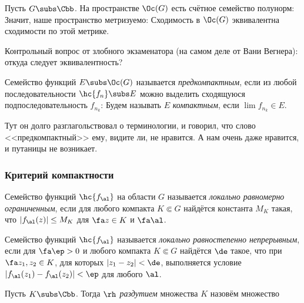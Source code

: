 \documentclass[a4paper]{article}
\begin{document}
\begin{theorem}
Пусть $G\subs \Cbb$. На пространстве $\Oc(G)$ есть счётное семейство полунорм:
Значит, наше пространство метризуемо:
Сходимость в $\Oc(G)$ эквивалентна сходимости по этой метрике.

\begin{petit}
Контрольный вопрос от злобного экзаменатора (на самом деле от Вани Вегнера): откуда следует эквивалентность?
\end{petit}

\begin{df} Семейство функций $E\subs \Oc(G)$ называется \emph{предкомпактным}, если из
любой последовательности $\hc{f_n}\subs E$ можно выделить сходящуюся подпоследовательность $f_{n_k}$:
Будем называть $E$ \emph{компактным}, если $\lim f_{n_k}\in E$.
\end{df}

\begin{petit}
Тут он долго разглагольствовал о терминологии, и говорил, что слово <<предкомпактный>> ему, видите ли, не нравится.
А нам очень даже нравится, и путаницы не возникает.
\end{petit}


\subsubsection{Критерий компактности}

\begin{df}
Семейство функций $\hc{f_\al}$ на области $G$ называется \emph{локально равномерно ограниченным},
если для любого компакта $K \Subset G$ найдётся константа $M_K$ такая, что $|f_\al(z)| \le M_K$
для $\fa z \in K$ и $\fa \al$.
\end{df}

\begin{df}
Семейство функций $\hc{f_\al}$ называется \emph{локально равностепенно непрерывным}, если для $\fa \ep > 0$ и
любого компакта $K \Subset G$ найдётся $\de$ такое, что при $\fa z_1,z_2\in K$, для которых $|z_1 - z_2| <\de$,
выполняется условие $|f_\al(z_1)-f_\al(z_2)|< \ep$ для любого $\al$.
\end{df}

\begin{df}
Пусть $K \subs \Cbb$. Тогда \emph{$\rh$ раздутием} множества $K$ назовём множество
\end{df}


\end{theorem}
\end{document}

